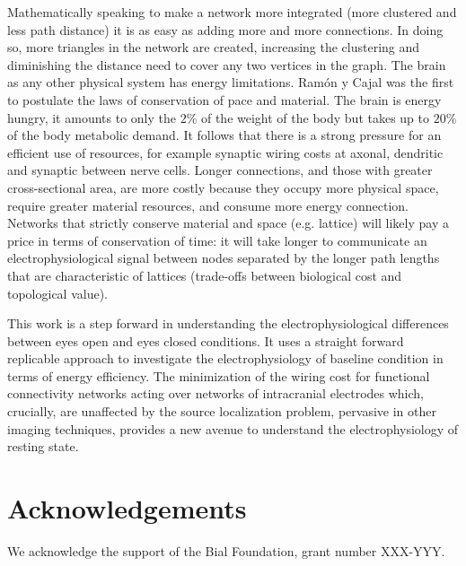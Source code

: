 \documentclass[11pt, onecolumn]{article}
\begin{document}
Mathematically speaking to make a network more integrated (more clustered and less path distance) it is as easy as adding more and more connections. In doing so, more triangles in the network are created, increasing the clustering and diminishing the distance need to cover any two vertices in the graph.
The brain as any other physical system has energy limitations. Ram{\'o}n y Cajal was the first to postulate the laws of conservation of pace and material. The brain is energy hungry, it amounts to only the $2\%$ of the weight of the body but takes up to $20\%$ of the body metabolic demand. It follows that there is a strong pressure for an efficient use of resources, for example synaptic wiring costs at axonal, dendritic and synaptic between nerve cells.
Longer connections, and those with greater cross-sectional area, are more costly because they occupy more physical space, require greater material resources, and consume more energy connection. Networks that strictly conserve material and space (e.g. lattice) will likely pay a price in terms of conservation of time: it will take longer to communicate an electrophysiological signal between nodes separated by the longer path lengths that are characteristic of lattices \citep{fornito2016fundamentals} (trade-offs between biological cost and topological value). 

This work is a step forward in understanding the electrophysiological differences between eyes open and eyes closed conditions. It uses a straight forward replicable approach to investigate the electrophysiology of baseline condition in terms of energy efficiency. The minimization of the wiring cost for functional connectivity networks acting over networks of intracranial electrodes which, crucially, are unaffected by the source localization problem, pervasive in other imaging techniques, provides a new avenue to understand the electrophysiology of resting state.

\section*{Acknowledgements}
We acknowledge the support of the Bial Foundation, grant number XXX-YYY.


%

\end{document}
